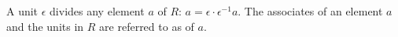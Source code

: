 A unit $\epsilon$ divides any element $a$ of $R$: $a = \epsilon \cdot \epsilon^{-1}a$. The associates of an element $a$ and the units in $R$ are referred to as  of $a$.
